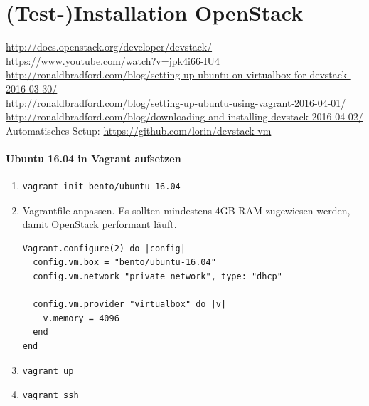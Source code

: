 \documentclass[a4paper,10pt]{article}
\begin{document}
\newpage

\section{(Test-)Installation OpenStack}

\url{http://docs.openstack.org/developer/devstack/}\\
\url{https://www.youtube.com/watch?v=jpk4i66-IU4}\\
\url{http://ronaldbradford.com/blog/setting-up-ubuntu-on-virtualbox-for-devstack-2016-03-30/}\\
\url{http://ronaldbradford.com/blog/setting-up-ubuntu-using-vagrant-2016-04-01/}\\
\url{http://ronaldbradford.com/blog/downloading-and-installing-devstack-2016-04-02/}\\

Automatisches Setup: \url{https://github.com/lorin/devstack-vm}

\paragraph{Ubuntu 16.04 in Vagrant aufsetzen}

\begin{enumerate}
 \item \begin{verbatim}vagrant init bento/ubuntu-16.04\end{verbatim}
 \item Vagrantfile anpassen. Es sollten mindestens 4GB RAM zugewiesen werden, damit OpenStack performant läuft.\\
\begin{minipage}{\textwidth}
\begin{lstlisting}
Vagrant.configure(2) do |config|
  config.vm.box = "bento/ubuntu-16.04"
  config.vm.network "private_network", type: "dhcp"
 
  config.vm.provider "virtualbox" do |v|
    v.memory = 4096
  end
end
\end{lstlisting}
\end{minipage}
 \item \begin{verbatim}vagrant up\end{verbatim}
 \item \begin{verbatim}vagrant ssh\end{verbatim}
\end{enumerate}
 
\end{document}
